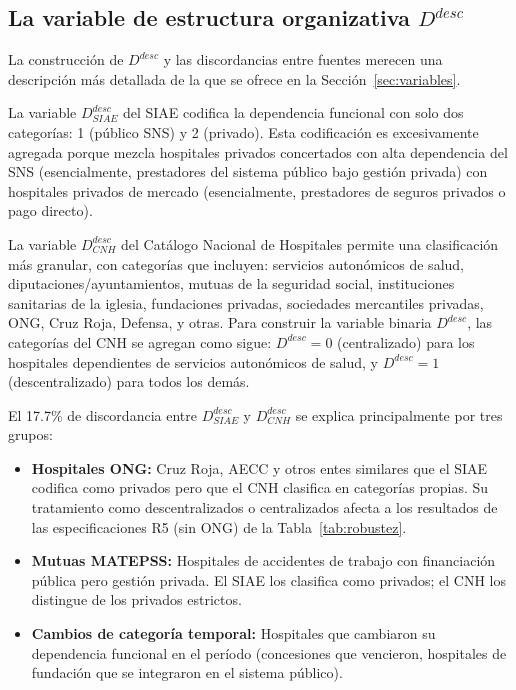 \documentclass[12pt, a4paper, twoside, openright]{book}
\theoremstyle{plain}
\theoremstyle{definition}
\theoremstyle{remark}
\begin{document}
\subsection{La variable de estructura organizativa \texorpdfstring{$D^{desc}$}{D\^{}desc}}

La construcción de $D^{desc}$ y las discordancias entre fuentes merecen una descripción más detallada de la que se ofrece en la Sección~\ref{sec:variables}.

La variable $D^{desc}_{SIAE}$ del SIAE codifica la dependencia funcional con solo dos categorías: 1 (público SNS) y 2 (privado). Esta codificación es excesivamente agregada porque mezcla hospitales privados concertados con alta dependencia del SNS (esencialmente, prestadores del sistema público bajo gestión privada) con hospitales privados de mercado (esencialmente, prestadores de seguros privados o pago directo).

La variable $D^{desc}_{CNH}$ del Catálogo Nacional de Hospitales permite una clasificación más granular, con categorías que incluyen: servicios autonómicos de salud, diputaciones/ayuntamientos, mutuas de la seguridad social, instituciones sanitarias de la iglesia, fundaciones privadas, sociedades mercantiles privadas, ONG, Cruz Roja, Defensa, y otras. Para construir la variable binaria $D^{desc}$, las categorías del CNH se agregan como sigue: $D^{desc} = 0$ (centralizado) para los hospitales dependientes de servicios autonómicos de salud, y $D^{desc} = 1$ (descentralizado) para todos los demás.

El 17.7\% de discordancia entre $D^{desc}_{SIAE}$ y $D^{desc}_{CNH}$ se explica principalmente por tres grupos:

\begin{itemize}
  \item \textbf{Hospitales ONG:} Cruz Roja, AECC y otros entes similares que el SIAE codifica como privados pero que el CNH clasifica en categorías propias. Su tratamiento como descentralizados o centralizados afecta a los resultados de las especificaciones R5 (sin ONG) de la Tabla~\ref{tab:robustez}.
  \item \textbf{Mutuas MATEPSS:} Hospitales de accidentes de trabajo con financiación pública pero gestión privada. El SIAE los clasifica como privados; el CNH los distingue de los privados estrictos.
  \item \textbf{Cambios de categoría temporal:} Hospitales que cambiaron su dependencia funcional en el período (concesiones que vencieron, hospitales de fundación que se integraron en el sistema público).
\end{itemize}
\end{document}
